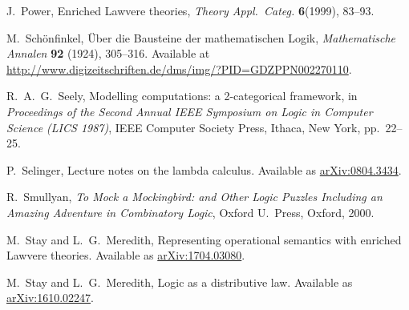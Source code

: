 \documentclass{amsart}
\theoremstyle{definition}
\begin{document}
\begin{thebibliography}{100}
 J.\ Power, Enriched Lawvere theories, \textsl{Theory Appl.\ Categ.} \textbf{6}(1999), 83--93.

 M.\ Sch\"{o}nfinkel, \"Uber die Bausteine der mathematischen Logik, 
 \textsl{Mathematische Annalen} \textbf{92} (1924), 305--316.  Available at \href{http://www.digizeitschriften.de/dms/img/?PID=GDZPPN002270110}{http://www.digizeitschriften.de/dms/img/?PID=GDZPPN002270110}.
 
 R.\ A.\ G.\ Seely, Modelling computations: a 2-categorical framework, in
\textsl{Proceedings of the Second Annual IEEE Symposium on Logic in Computer Science (LICS 1987)}, IEEE Computer Society Press, Ithaca, New York, pp.\ 22--25.
 
  P.\ Selinger, Lecture notes on the lambda calculus.  Available as 
 \href{https://arxiv.org/abs/0804.3434}{arXiv:0804.3434}.

 R.\ Smullyan, \textsl{To Mock a Mockingbird: and Other Logic Puzzles Including an Amazing Adventure in Combinatory Logic}, Oxford U.\ Press, Oxford, 2000.
	
 M.\ Stay and L.\ G.\ Meredith, Representing operational semantics 
with enriched Lawvere theories.  Available as
\href{https://arxiv.org/abs/1704.03080}{arXiv:1704.03080}.

 M.\ Stay and L.\ G.\ Meredith, Logic as a distributive law.  Available as \href{https://arxiv.org/abs/1610.02247}{arXiv:1610.02247}.

\end{thebibliography}
\end{document}
